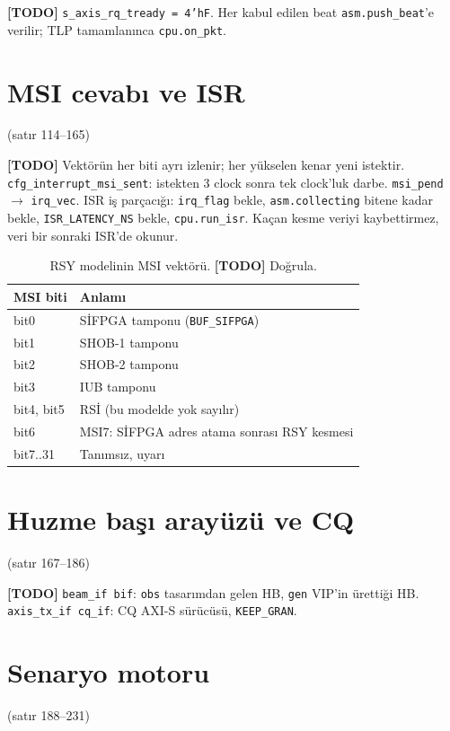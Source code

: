 \documentclass[11pt,a4paper]{article}
\newcommand{\kod}[1]{\texttt{#1}}
\newcommand{\todo}[1]{\textcolor{red!60!black}{\textbf{[TODO]} #1}}
\newcommand{\satir}[1]{\textcolor{black!60}{\scriptsize(satır #1)}}
\begin{document}
\todo{\kod{s\_axis\_rq\_tready = 4'hF}. Her kabul edilen beat \kod{asm.push\_beat}'e
verilir; TLP tamamlanınca \kod{cpu.on\_pkt}.}

\section{MSI cevabı ve ISR}
\satir{114--165}

\todo{Vektörün her biti ayrı izlenir; her yükselen kenar yeni istektir.
\kod{cfg\_interrupt\_msi\_sent}: istekten 3 clock sonra tek clock'luk darbe.
\kod{msi\_pend} $\to$ \kod{irq\_vec}. ISR iş parçacığı: \kod{irq\_flag} bekle,
\kod{asm.collecting} bitene kadar bekle, \kod{ISR\_LATENCY\_NS} bekle,
\kod{cpu.run\_isr}. Kaçan kesme veriyi kaybettirmez, veri bir sonraki ISR'de okunur.}

\begin{table}[h]
\centering
\begin{tabular}{@{}ll@{}}
\toprule
MSI biti & Anlamı \\
\midrule
bit0 & SİFPGA tamponu (\kod{BUF\_SIFPGA}) \\
bit1 & SHOB-1 tamponu \\
bit2 & SHOB-2 tamponu \\
bit3 & IUB tamponu \\
bit4, bit5 & RSİ (bu modelde yok sayılır) \\
bit6 & MSI7: SİFPGA adres atama sonrası RSY kesmesi \\
bit7..31 & Tanımsız, uyarı \\
\bottomrule
\end{tabular}
\caption{RSY modelinin MSI vektörü. \todo{Doğrula.}}
\end{table}

\section{Huzme başı arayüzü ve CQ}
\satir{167--186}

\todo{\kod{beam\_if bif}: \kod{obs} tasarımdan gelen HB, \kod{gen} VIP'in ürettiği HB.
\kod{axis\_tx\_if cq\_if}: CQ AXI-S sürücüsü, \kod{KEEP\_GRAN}.}

\section{Senaryo motoru}
\satir{188--231}
\end{document}
